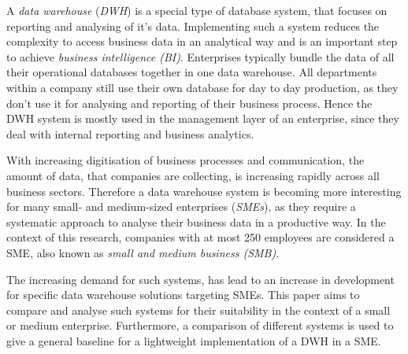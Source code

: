 \documentclass[../paper.tex]{subfiles}
\begin{document}
A \textit{data warehouse} (\textit{DWH}) is a special type of database system, that focuses on reporting and analysing of it's data. Implementing such a system reduces the complexity to access business data in an analytical way and is an important step to achieve \textit{business intelligence (BI)}. Enterprises typically bundle the data of all their operational databases together in one data warehouse. All departments within a company still use their own database for day to day production, as they don't use it for analysing and reporting of their business process. Hence the DWH system is mostly used in the management layer of an enterprise, since they deal with internal reporting and business analytics.

With increasing digitisation of business processes and communication, the amount of data, that companies are collecting, is increasing rapidly across all business sectors. Therefore a data warehouse system is becoming more interesting for many small- and medium-sized enterprises (\textit{SMEs}), as they require a systematic approach to analyse their business data in a productive way. In the context of this research, companies with at most 250 employees are considered a SME, also known as \textit{small and medium business (SMB)}.

The increasing demand for such systems, has lead to an increase in development for specific data warehouse solutions targeting SMEs. This paper aims to compare and analyse such systems for their suitability in the context of a small or medium enterprise. Furthermore, a comparison of different systems is used to give a general baseline for a lightweight implementation of a DWH in a SME.
\end{document}

